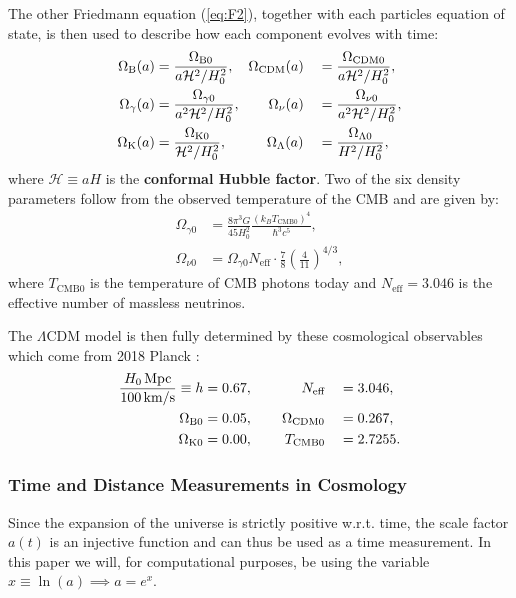 \documentclass[%
reprint,
 amsmath,amssymb,
 aps,
]{revtex4-2}
\newcommand{\Hp}{\mathcal{H}}
\begin{document}
The other Friedmann equation (\ref{eq:F2}), together with each particles equation of state, is then used to describe how each component evolves with time:
\begin{alignat}{2}
	\Omega_{\text B}(a)&=\frac{\Omega_{\text B0}}{a\Hp^2/H_0^2},\hspace{3.5mm}\Omega_{\text{CDM}}(a)&&=\frac{\Omega_{\text{CDM}0}}{a\Hp^2/H_0^2},\nonumber\\
	\Omega_{\gamma}(a)&=\frac{\Omega_{\gamma0}}{a^2\Hp^2/H_0^2},\hspace{7mm}\Omega_{\nu}(a)&&=\frac{\Omega_{\nu0}}{a^2\Hp^2/H_0^2},\label{eq:Omegai}\\
	\Omega_{\text K}(a)&=\frac{\Omega_{\text K0}}{\Hp^2/H_0^2},\hspace{10mm}\Omega_{\Lambda}(a)&&=\frac{\Omega_{\Lambda0}}{H^2/H_0^2},\nonumber
\end{alignat}
where $\Hp\equiv aH$ is the \textbf{conformal Hubble factor}. 
Two of the six density parameters follow from the observed temperature of the CMB and are given by:
\begin{align}
	\label{eq:ORad}
	\Omega_{\gamma0}&=\frac{8\pi^3 G}{45 H_0^2}\frac{(k_BT_{\text{CMB}0})^4}{\hbar^3 c^5},\\
	\label{eq:ONu}
	\Omega_{\nu0}&=\Omega_{\gamma0}N_{\text{eff}}\cdot\frac{7}{8}\left(\frac{4}{11}\right)^{4/3},
\end{align}
where $T_{\text{CMB}0}$ is the temperature of CMB photons today and $N_{\text{eff}}=3.046$ is the effective number of massless neutrinos. \cite{Planck:2018vyg}

The $\Lambda$CDM model is then fully determined by these cosmological observables which come from 2018 Planck \cite{Planck:2018vyg}:
\begin{alignat}{2}
	\frac{H_0\,\text{Mpc}}{100\,\text{km/s}}\equiv h &= 0.67,\hspace{12.2mm}N_\text{eff}&&=3.046,\nonumber\\
	\Omega_{\text B0}&=0.05,\hspace{7.3mm}\Omega_{\text{CDM}0}&&=0.267,\label{eq:planck_data}\\
	\Omega_{\text K0}&=0.00,\hspace{8mm}T_{\text{CMB}0}&&=2.7255.\nonumber
\end{alignat}
\subsubsection{Time and Distance Measurements in Cosmology}
Since the expansion of the universe is strictly positive w.r.t. time, the scale factor $a(t)$ is an injective function and can thus be used as a time measurement. In this paper we will, for computational purposes, be using the variable $x\equiv\ln(a)\implies a=e^x$. 
\end{document}
